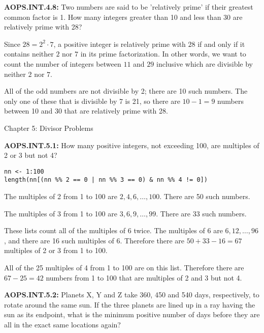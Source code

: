 \documentclass[11pt]{article}
\newenvironment{uzdevums}[1][\unskip]{%
\vspace{3mm}
\noindent
\textbf{#1:}
\noindent}
{}
\begin{document}
\begin{uzdevums}[AOPS.INT.4.8]
Two numbers are said to be 'relatively prime' if their greatest common factor is 1. How many integers greater than 10 and less than 30 are relatively prime with 28?
\end{uzdevums}

Since $28=2^2\cdot 7$, a positive integer is relatively prime with $28$ if and only if it contains neither $2$ nor $7$ in its prime factorization. In other words, we want to count the number of integers between $11$ and $29$ inclusive which are divisible by neither $2$ nor $7$.

All of the odd numbers are not divisible by 2; there are 10 such numbers. The only one of these that is divisible by 7 is 21, so there are $10- 1 =\boxed{9}$ numbers between 10 and 30 that are relatively prime with 28.







\vspace{30px}
\begin{center}
{\large Chapter 5: Divisor Problems}
\end{center}



\begin{uzdevums}[AOPS.INT.5.1]
How many positive integers, not exceeding 100, are multiples of 2 or 3 but not 4?
\end{uzdevums}

\begin{verbatim}
nn <- 1:100
length(nn[(nn %% 2 == 0 | nn %% 3 == 0) & nn %% 4 != 0])
\end{verbatim}

The multiples of 2 from 1 to 100 are $2, 4, 6,\ldots, 100$. There are 50 such numbers.

The multiples of 3 from 1 to 100 are $3, 6, 9,\ldots, 99$. There are 33 such numbers.

These lists count all of the multiples of 6 twice. The multiples of 6 are $6, 12,\ldots,96$, and there are 16 such multiples of 6. Therefore there are $50+33-16=67$ multiples of 2 or 3 from 1 to 100.

All of the 25 multiples of 4 from 1 to 100 are on this list. Therefore there are $67-25=\boxed{42}$ numbers from 1 to 100 that are multiples of 2 and 3 but not 4.


\begin{uzdevums}[AOPS.INT.5.2]
Planets X, Y and Z take 360, 450 and 540 days, respectively, to rotate around the same sun. If the three planets are lined up in a ray having the sun as its endpoint, what is the minimum positive number of days before they are all in the exact same locations again?
\end{uzdevums}
\end{document}
